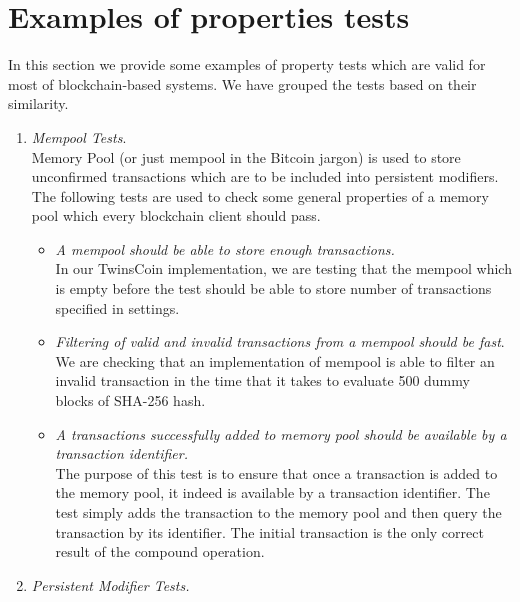 
\section{Examples of properties tests}
In this section we provide some examples of property tests which are valid for most of blockchain-based systems. We have grouped the tests based on their similarity.

\begin{enumerate}[\IEEEsetlabelwidth{Z}]
\item \textit{Mempool Tests}.\\
Memory Pool (or just mempool in the Bitcoin jargon) is used to store unconfirmed transactions which are to be included into persistent modifiers. The following tests are used to check some general properties of a memory pool which every blockchain client should pass.

\begin{itemize}[]

\item \textit{A mempool should be able to store enough transactions.}\\
In our TwinsCoin implementation, we are testing that the mempool which is empty before the test should be able to store number of transactions specified in settings.

\item \textit{Filtering of valid and invalid transactions from a mempool should be fast}.\\
We are checking that an implementation of mempool is able to filter an invalid transaction in the time that it takes to evaluate 500 dummy blocks of SHA-256 hash.

\item \textit{A transactions successfully added to memory pool should be available by a transaction identifier.}\\

The purpose of this test is to ensure that once a transaction is added to the memory pool, it indeed is available by a transaction identifier. The test simply adds the transaction to the memory pool and then query the transaction by its identifier. The initial transaction is the only correct result of the compound operation. 

\end{itemize}

\item \textit{Persistent Modifier Tests.}\\


\end{enumerate}
